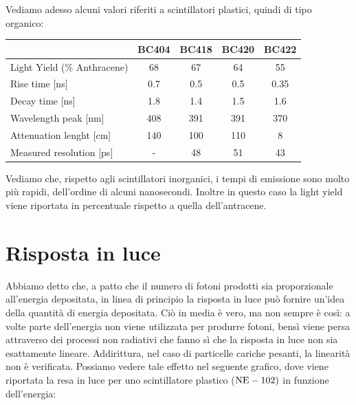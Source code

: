 \begin{esempio}
\begin{itemize}[leftmargin=0.5cm]
   \end{itemize}
\end{esempio}

\begin{esempio}
   Vediamo adesso alcuni valori riferiti a scintillatori plastici, quindi di tipo organico:
   \begin{center}
      \begin{tabular}{|lcccc|}
        \hline
         & BC404 & BC418 & BC420 & BC422\\
        \hline
        Light Yield (\% Anthracene) & 68 & 67 & 64 & 55\\
        \hline
        Rise time [ns] & 0.7 & 0.5 & 0.5 & 0.35\\
        \hline
        Decay time [ns] & 1.8 & 1.4 & 1.5 & 1.6\\
        \hline
        Wavelength peak [nm] & 408 & 391 & 391 & 370\\
        \hline
        Attenuation lenght [cm] & 140 & 100 & 110 & 8\\
        \hline
        Measured resolution [ps] & - & 48 & 51 & 43\\
        \hline
      \end{tabular}
    \end{center}
   Vediamo che, rispetto agli scintillatori inorganici, i tempi di emissione sono molto più rapidi, dell'ordine di alcuni nanosecondi. Inoltre in questo caso la light yield viene riportata in percentuale rispetto a quella dell'antracene.
\end{esempio}

\section{Risposta in luce}

Abbiamo detto che, a patto che il numero di fotoni prodotti sia proporzionale all'energia depositata, in linea di principio la risposta in luce può fornire un'idea della quantità di energia depositata. Ciò in media è vero, ma non sempre è così: a volte parte dell'energia non viene utilizzata per produrre fotoni, bensì viene persa attraverso dei processi non radiativi che fanno sì che la risposta in luce non sia esattamente lineare. Addirittura, nel caso di particelle cariche pesanti, la linearità non è verificata. Possiamo vedere tale effetto nel seguente grafico, dove viene riportata la resa in luce per uno scintillatore plastico ($\rm NE-102)$ in funzione dell'energia:


